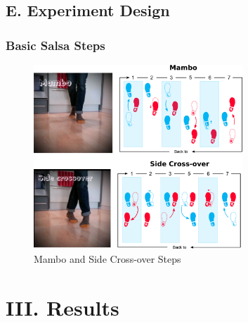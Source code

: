 \documentclass{beamer}
\begin{document}
\subsection{E. Experiment Design}






\begin{frame}
\frametitle{Basic Salsa Steps}
\vspace{-0.7cm}


\begin{figure}[!htb]
\centering
\includegraphics[width=0.7\textwidth]{steps00}
\caption[PA]{Mambo and Side Cross-over Steps}

\label{fig:sn}
\end{figure}



\end{frame}


%




\section{III. Results}
\end{document}
